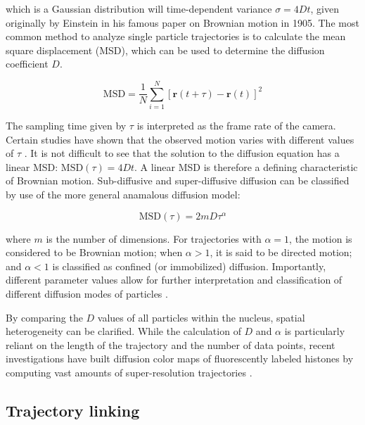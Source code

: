 which is a Gaussian distribution will time-dependent variance $\sigma=4Dt$, given originally by Einstein in his famous paper on Brownian motion in 1905. The most common method to analyze single particle trajectories is to calculate the mean square displacement (MSD), which can be used to determine the diffusion coefficient $D$.

\begin{equation}
\text{MSD} = \frac{1}{N} \sum_{i=1}^{N} \left[ \mathbf{r}(t + \tau) - \mathbf{r}(t) \right]^2
\end{equation}

The sampling time given by $\tau$ is interpreted as the frame rate of the camera. Certain studies have shown that the observed motion varies with different values of $\tau$ \parencite{Amitai2017,Shukron2017a}. It is not difficult to see that the solution to the diffusion equation has a linear MSD: $\text{MSD}(\tau) = 4Dt$. A linear MSD is therefore a defining characteristic of Brownian motion. Sub-diffusive and super-diffusive diffusion can be classified by use of the more general anamalous diffusion model:

\begin{equation}
\text{MSD}(\tau) = 2mD\tau^\alpha
\end{equation}

where $m$ is the number of dimensions. For trajectories with $\alpha = 1$, the motion is considered to be Brownian motion; when $\alpha > 1$, it is said to be directed motion; and $\alpha < 1$ is classified as confined (or immobilized) diffusion. Importantly, different parameter values allow for further interpretation and classification of different diffusion modes of particles \parencite{Wasim2018,Zhong2020}.

By comparing the $D$ values of all particles within the nucleus, spatial heterogeneity can be clarified. While the calculation of $D$ and $\alpha$ is particularly reliant on the length of the trajectory and the number of data points, recent investigations have built diffusion color maps of fluorescently labeled histones by computing vast amounts of super-resolution trajectories \parencite{Amitai2017,Barth2020,Nozaki2017}.

\subsection{Trajectory linking}

